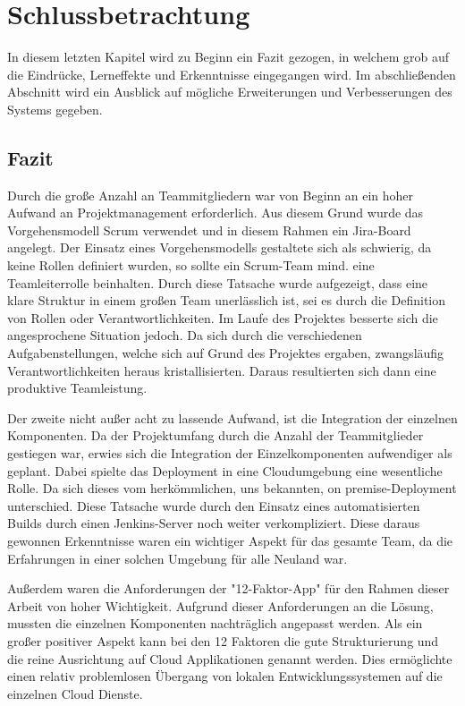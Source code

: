 \section{Schlussbetrachtung}
In diesem letzten Kapitel wird zu Beginn ein Fazit gezogen, in welchem grob auf die Eindrücke, Lerneffekte und Erkenntnisse eingegangen wird. Im abschließenden Abschnitt wird ein Ausblick auf mögliche Erweiterungen und Verbesserungen des Systems gegeben. 
\subsection{Fazit}

Durch die große Anzahl an Teammitgliedern war von Beginn an ein hoher Aufwand an Projektmanagement erforderlich. Aus diesem Grund wurde das Vorgehensmodell Scrum verwendet und in diesem Rahmen ein Jira-Board angelegt. Der Einsatz eines Vorgehensmodells gestaltete sich als schwierig, da keine Rollen definiert wurden, so sollte ein Scrum-Team mind. eine Teamleiterrolle beinhalten. Durch diese Tatsache wurde aufgezeigt, dass eine klare Struktur in einem großen Team unerlässlich ist, sei es durch die Definition von Rollen oder Verantwortlichkeiten. 
Im Laufe des Projektes besserte sich die angesprochene Situation jedoch. Da sich durch die verschiedenen Aufgabenstellungen, welche sich auf Grund des Projektes ergaben, zwangsläufig Verantwortlichkeiten heraus kristallisierten. 
Daraus resultierten sich dann eine produktive Teamleistung. 

Der zweite nicht außer acht zu lassende Aufwand, ist die Integration der einzelnen Komponenten. 
Da der Projektumfang durch die Anzahl der Teammitglieder gestiegen war, erwies sich die Integration der Einzelkomponenten aufwendiger als geplant. Dabei spielte das Deployment in eine Cloudumgebung eine wesentliche Rolle. Da sich dieses vom herkömmlichen, uns bekannten, on premise-Deployment unterschied. Diese Tatsache wurde durch den Einsatz eines automatisierten Builds durch einen Jenkins-Server noch weiter verkompliziert. 
Diese daraus gewonnen Erkenntnisse waren ein wichtiger Aspekt für das gesamte Team, da die Erfahrungen in einer solchen Umgebung für alle Neuland war. 

Außerdem waren die Anforderungen der "12-Faktor-App" für den Rahmen dieser Arbeit von hoher Wichtigkeit. Aufgrund dieser Anforderungen an die Lösung, mussten die einzelnen Komponenten nachträglich angepasst werden. Als ein großer positiver Aspekt kann bei den 12 Faktoren die gute Strukturierung und die reine Ausrichtung auf Cloud Applikationen genannt werden. Dies ermöglichte einen relativ problemlosen Übergang von lokalen Entwicklungssystemen auf die einzelnen Cloud Dienste. 

